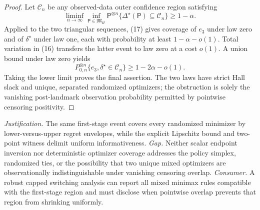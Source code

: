 \documentclass{article}
\begin{document}
\begin{proof}
Let \(\mathcal C_n\) be any observed-data outer confidence region satisfying
\[
 \liminf_{n\to\infty}\inf_{\mathsf P\in\mathfrak M_H}
 \mathsf P^{\otimes n}\{\Delta^\star(\mathsf P)\subseteq\mathcal C_n\}
 \ge1-\alpha.                                           \tag{17}
\]
Applied to the two triangular sequences, (17) gives coverage of \(e_3\) under law zero and of \(\delta^\star\) under law one, each with probability at least \(1-\alpha-o(1)\).  Total variation in (16) transfers the latter event to law zero at a cost \(o(1)\).  A union bound under law zero yields
\[
 P_{0,n}^{\otimes n}\{e_3,\delta^\star\in\mathcal C_n\}
 \ge1-2\alpha-o(1).                                     \tag{18}
\]
Taking the lower limit proves the final assertion.  The two laws have strict Hall slack and unique, separated randomized optimizers; the obstruction is solely the vanishing post-landmark observation probability permitted by pointwise censoring positivity.
\end{proof}
\par\smallskip\noindent \textit{Justification.} The same first-stage event covers every randomized minimizer by lower-versus-upper regret envelopes, while the explicit Lipschitz bound and two-point witness delimit uniform informativeness. \textit{Gap.} Neither scalar endpoint inversion nor deterministic optimizer coverage addresses the policy simplex, randomized ties, or the possibility that two unique mixed optimizers are observationally indistinguishable under vanishing censoring overlap. \textit{Consumer.} A robust capped switching analysis can report all mixed minimax rules compatible with the first-stage region and must disclose when pointwise overlap prevents that region from shrinking uniformly.
\end{document}
